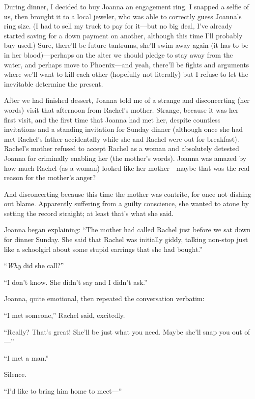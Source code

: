 During dinner, I decided to buy Joanna an engagement ring. I snapped a
selfie of us, then brought it to a local jeweler, who was able to
correctly guess Joanna's ring size. (I had to sell my truck to pay for
it---but no big deal, I've already started saving for a down payment on
another, although this time I'll probably buy used.) Sure, there'll be
future tantrums, she'll swim away again (it has to be in her
blood)---perhaps on the alter we should pledge to stay away from the
water, and perhaps move to Phoenix---and yeah, there'll be fights and
arguments where we'll want to kill each other (hopefully not literally)
but I refuse to let the inevitable determine the present.

After we had finished dessert, Joanna told me of a strange and
disconcerting (her words) visit that afternoon from Rachel's mother.
Strange, because it was her first visit, and the first time that Joanna
had met her, despite countless invitations and a standing invitation for
Sunday dinner (although once she had met Rachel's father accidentally
while she and Rachel were out for breakfast). Rachel's mother refused to
accept Rachel as a woman and absolutely detested Joanna for criminally
enabling her (the mother's words). Joanna was amazed by how much Rachel
(as a woman) looked like her mother---maybe that was the real reason for
the mother's anger?

And disconcerting because this time the mother was contrite, for once
not dishing out blame. Apparently suffering from a guilty conscience,
she wanted to atone by setting the record straight; at least that's what
she said.

Joanna began explaining: ``The mother had called Rachel just before we
sat down for dinner Sunday. She said that Rachel was initially giddy,
talking non-stop just like a schoolgirl about some stupid earrings that
she had bought.''

``\emph{Why} did she call?''

``I don't know. She didn't say and I didn't ask.''

Joanna, quite emotional, then repeated the conversation verbatim:

``I met someone,'' Rachel said, excitedly.

``Really? That's great! She'll be just what you need. Maybe she'll snap
you out of---''

``I met a man.''

Silence.

``I'd like to bring him home to meet---''

